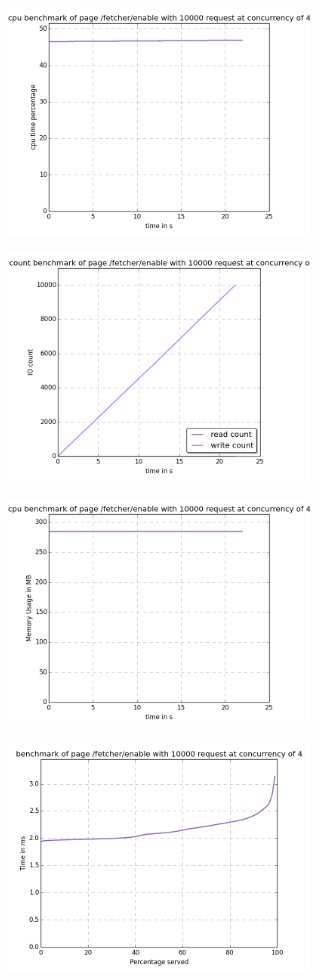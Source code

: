 \begin{center}
\includegraphics[width=0.6\textwidth]{img/fetcher.enable.cpu.png}



\includegraphics[width=0.6\textwidth]{img/fetcher.enable.io-count.png}



\includegraphics[width=0.6\textwidth]{img/fetcher.enable.mem.png}



\includegraphics[width=0.6\textwidth]{img/fetcher.enable.serv-time.png}




\end{center}
